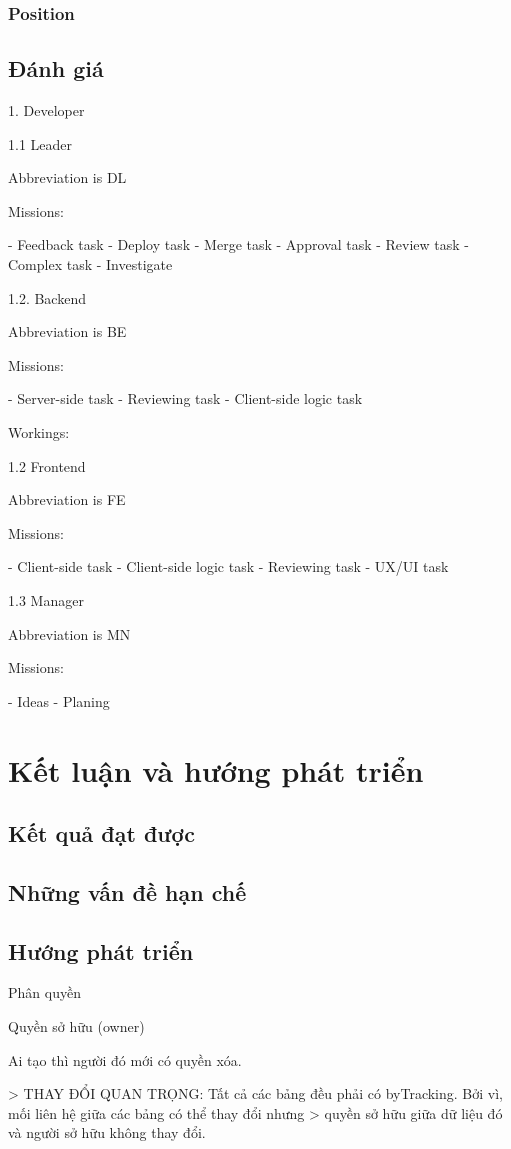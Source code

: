 \documentclass{report}
\begin{document}
\section{Position}
\chapter{Đánh giá}
1. Developer

1.1 Leader

Abbreviation is DL

Missions:

- Feedback task
- Deploy task
- Merge task
- Approval task
- Review task
- Complex task
- Investigate

1.2. Backend

Abbreviation is BE

Missions:

- Server-side task
- Reviewing task
- Client-side logic task

Workings:

1.2 Frontend

Abbreviation is FE

Missions:

- Client-side task
- Client-side logic task
- Reviewing task
- UX/UI task

1.3 Manager

Abbreviation is MN 

Missions:

- Ideas
- Planing

\part*{Kết luận và hướng phát triển}

\chapter{Kết quả đạt được}
\chapter{Những vấn đề hạn chế}
\chapter{Hướng phát triển}
 Phân quyền

Quyền sở hữu (owner)

Ai tạo thì người đó mới có quyền xóa.

> THAY ĐỔI QUAN TRỌNG: Tất cả các bảng đều phải có byTracking. Bởi vì, mối liên hệ giữa các bảng có thể thay đổi nhưng
> quyền sở hữu giữa dữ liệu đó và người sở hữu không thay đổi.
\end{document}
